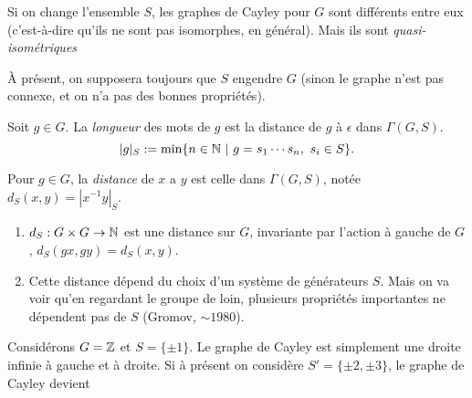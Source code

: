   \begin{rem}
    Si on change l'ensemble $S$, les graphes de Cayley pour $G$ sont différents entre eux (c'est-à-dire qu'ils
    ne sont pas isomorphes, en général). Mais ils sont \emph{quasi-isométriques} 
  \end{rem}


  À présent, on supposera toujours que $S$ engendre $G$ (sinon le graphe n'est pas connexe, et on n'a pas des
  bonnes propriétés).

  \begin{defi} 
    Soit $g \in G$. La \emph{longueur} des mots de $g$ est la distance de $g$ à $\epsilon$ dans $\Gamma(G,S)$.
      \[|g|_S := \min\{n \in \mathbb{N}\ |\ g = s_1\cdots s_n,\ s_i \in S\}.\]

    Pour $g \in G$, la \emph{distance} de $x$ a $y$  est celle dans
    $\Gamma(G,S)$, notée $d_S(x,y) = |x^{-1}y|_S$.
  \end{defi}

  \begin{obss}
    \begin{enumerate}
    \item $d_S: G \times G \to \mathbb{N}$ est une distance sur $G$, invariante par l'action à gauche de $G$, $d_S(gx,
      gy) = d_S(x,y)$.

    \item Cette distance dépend du choix d'un système de générateurs $S$. Mais on va voir qu'en regardant le
      groupe \og de loin\fg, plusieurs propriétés importantes ne dépendent pas de $S$ (Gromov, $\sim 1980$).
    \end{enumerate}
  \end{obss}

  \begin{ex}
    Considérons $G = \mathbb{Z}$ et $S = \{\pm 1\}$. Le graphe de Cayley est simplement une droite infinie à gauche et
    à droite. Si à présent on considère $S' = \{\pm 2, \pm 3\}$, le graphe de Cayley devient 
    \begin{center}
    

          \end{center}
  \end{ex}



